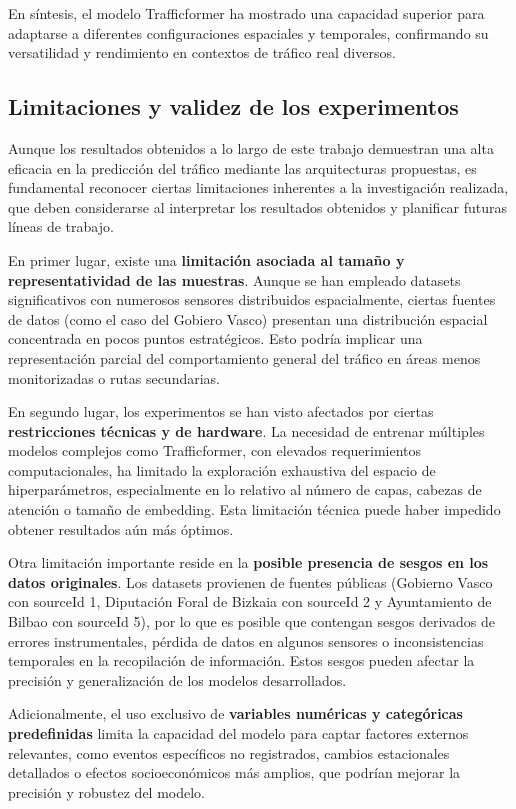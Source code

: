 En síntesis, el modelo Trafficformer ha mostrado una capacidad superior para adaptarse a diferentes configuraciones espaciales y temporales, confirmando su versatilidad y rendimiento en contextos de tráfico real diversos.

\subsection{Limitaciones y validez de los experimentos}
\label{sec:limitaciones_validez}

Aunque los resultados obtenidos a lo largo de este trabajo demuestran una alta eficacia en la predicción del tráfico mediante las arquitecturas propuestas, es fundamental reconocer ciertas limitaciones inherentes a la investigación realizada, que deben considerarse al interpretar los resultados obtenidos y planificar futuras líneas de trabajo.

En primer lugar, existe una \textbf{limitación asociada al tamaño y representatividad de las muestras}. Aunque se han empleado datasets significativos con numerosos sensores distribuidos espacialmente, ciertas fuentes de datos (como el caso del Gobiero Vasco) presentan una distribución espacial concentrada en pocos puntos estratégicos. Esto podría implicar una representación parcial del comportamiento general del tráfico en áreas menos monitorizadas o rutas secundarias.

En segundo lugar, los experimentos se han visto afectados por ciertas \textbf{restricciones técnicas y de hardware}. La necesidad de entrenar múltiples modelos complejos como Trafficformer, con elevados requerimientos computacionales, ha limitado la exploración exhaustiva del espacio de hiperparámetros, especialmente en lo relativo al número de capas, cabezas de atención o tamaño de embedding. Esta limitación técnica puede haber impedido obtener resultados aún más óptimos.

Otra limitación importante reside en la \textbf{posible presencia de sesgos en los datos originales}. Los datasets provienen de fuentes públicas (Gobierno Vasco con sourceId 1, Diputación Foral de Bizkaia con sourceId 2 y Ayuntamiento de Bilbao con sourceId 5), por lo que es posible que contengan sesgos derivados de errores instrumentales, pérdida de datos en algunos sensores o inconsistencias temporales en la recopilación de información. Estos sesgos pueden afectar la precisión y generalización de los modelos desarrollados.

Adicionalmente, el uso exclusivo de \textbf{variables numéricas y categóricas predefinidas} limita la capacidad del modelo para captar factores externos relevantes, como eventos específicos no registrados, cambios estacionales detallados o efectos socioeconómicos más amplios, que podrían mejorar la precisión y robustez del modelo.

